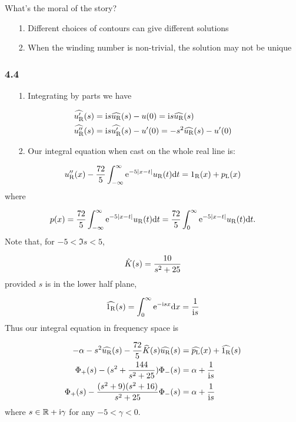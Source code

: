 \documentclass[12pt,landscape]{article}
\def\D{ {\rm d} }
\def\I{ {\rm i} }
\def\E{ {\rm e} }
\def\R{ {\mathbb R} }
\def\dx{\D x}
\def\dt{\D t}
\def\rR{ {\rm R} }
\def\rL{ {\rm L} }
\begin{document}
{What's the moral of the story?

\begin{itemize}
\item[1. ] Different choices of contours can give different solutions


\item[2. ] When the winding number is non-trivial, the solution may not be unique

\end{itemize}
\subsubsection{4.4}
\begin{itemize}
\item[1. ] Integrating by parts we have

\end{itemize}

\begin{align*}
\widehat{u_\rR'}(s) &= \I s \widehat{u_\rR}(s) - u(0) = \I s \widehat{u_\rR}(s) \\
\widehat{u_\rR''}(s) &= \I s \widehat{u_\rR'}(s) - u'(0)  = -s^2 \widehat{u_\rR}(s) - u'(0)
\end{align*}
\begin{itemize}
\item[2. ] Our integral equation when cast on the whole real line is:

\end{itemize}
\[
u_\rR''(x) - {72 \over 5} \int_{-\infty}^\infty \E^{-5 |x-t|} u_\rR(t)\dt = 1_\rR(x) + p_\rL(x)
\]
where

\[
p(x) = {72 \over 5} \int_{-\infty}^\infty \E^{-5 |x-t|} u_\rR(t)\dt =  {72 \over 5} \int_0^\infty \E^{-5 |x-t|} u_\rR(t)\dt.
\]
Note that, for $-5 <\Im s < 5$,

\[
\hat K(s) = {10 \over s^2 + 25}
\]
provided $s$ is in the lower half plane,

\[
\widehat{1_\rR}(s) = \int_0^\infty \E^{-\I s x} \dx = {1 \over \I s}
\]
Thus our integral equation in frequency space is


\begin{align*}
-\alpha - s^2 \widehat{u_\rR}(s) -  {72 \over 5} \widehat K(s) \widehat{u_\rR}(s) &=\widehat{p_\rL}(x) +  \widehat{1_\rR}(s)\\
\Phi_+(s) - (s^2 +   {144 \over s^2+25}) \Phi_-(s) &= \alpha + {1 \over \I s}\\
\Phi_+(s) -  {(s^2 + 9) (s^2+16) \over s^2+25} \Phi_-(s) &= \alpha + {1 \over \I s}
\end{align*}
where $s \in \R +\I \gamma$ for any $-5 < \gamma < 0$.

}
\end{document}
